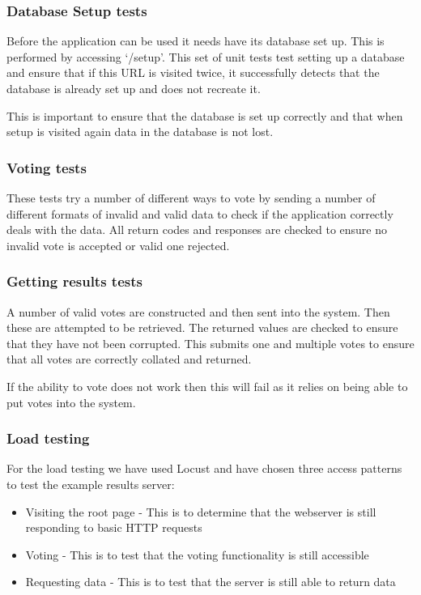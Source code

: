\subsubsection{Database Setup tests}

Before the application can be used it needs have its database set up. This is performed by accessing `/setup'. This set of unit tests test setting up a database and ensure that if this URL is visited twice, it successfully detects that the database is already set up and does not recreate it. 

This is important to ensure that the database is set up correctly and that when setup is visited again data in the database is not lost.

\subsubsection{Voting tests}

These tests try a number of different ways to vote by sending a number of different formats of invalid and valid data to check if the application correctly deals with the data. All return codes and responses are checked to ensure no invalid vote is accepted or valid one rejected.

\subsubsection{Getting results tests}

A number of valid votes are constructed and then sent into the system. Then these are attempted to be retrieved. The returned values are checked to ensure that they have not been corrupted. This submits one and multiple votes to ensure that all votes are correctly collated and returned.

If the ability to vote does not work then this will fail as it relies on being able to put votes into the system.

\subsubsection{Load testing}

For the load testing we have used Locust and have chosen three access patterns to test the example results server:

\begin{itemize}
\item Visiting the root page - This is to determine that the webserver is still responding to basic HTTP requests
\item Voting - This is to test that the voting functionality is still accessible
\item Requesting data - This is to test that the server is still able to return data
\end{itemize}

